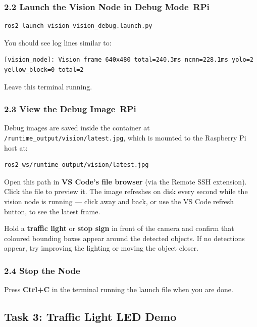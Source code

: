 \documentclass{ol-softwaremanual}
\newcommand{\onrpi}{%
  \,\colorbox{blue!20}{\footnotesize\sffamily\bfseries RPi}}
\begin{document}
\subsubsection*{2.2 Launch the Vision Node in Debug Mode\onrpi}

\begin{verbatim}
ros2 launch vision vision_debug.launch.py
\end{verbatim}

You should see log lines similar to:

\begin{verbatim}
[vision_node]: Vision frame 640x480 total=240.3ms ncnn=228.1ms yolo=2 yellow_block=0 total=2
\end{verbatim}

Leave this terminal running.

\subsubsection*{2.3 View the Debug Image\onrpi}

Debug images are saved inside the container at
\texttt{/runtime\_output/vision/latest.jpg}, which is mounted to the
Raspberry Pi host at:

\begin{verbatim}
ros2_ws/runtime_output/vision/latest.jpg
\end{verbatim}

Open this path in \textbf{VS Code's file browser} (via the Remote SSH
extension).
Click the file to preview it.
The image refreshes on disk every second while the vision node is running ---
click away and back, or use the VS Code refresh button, to see the latest frame.

Hold a \textbf{traffic light} or \textbf{stop sign} in front of the camera and
confirm that coloured bounding boxes appear around the detected objects.
If no detections appear, try improving the lighting or moving the object closer.

\subsubsection*{2.4 Stop the Node}

Press \textbf{Ctrl+C} in the terminal running the launch file when you are done.


\subsection{Task 3: Traffic Light LED Demo}
\end{document}
